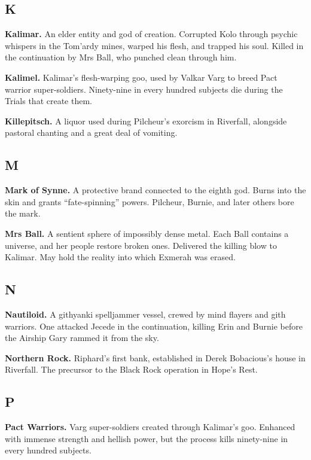 \subsection*{K}

\noindent
\textbf{Kalimar.} An elder entity and god of creation. Corrupted Kolo through psychic whispers in the Tom'ardy mines, warped his flesh, and trapped his soul. Killed in the continuation by Mrs Ball, who punched clean through him.

\smallskip \noindent
\textbf{Kalimel.} Kalimar's flesh-warping goo, used by Valkar Varg to breed Pact warrior super-soldiers. Ninety-nine in every hundred subjects die during the Trials that create them.

\smallskip \noindent
\textbf{Killepitsch.} A liquor used during Pilcheur's exorcism in Riverfall, alongside pastoral chanting and a great deal of vomiting.

\subsection*{M}

\noindent
\textbf{Mark of Synne.} A protective brand connected to the eighth god. Burns into the skin and grants ``fate-spinning'' powers. Pilcheur, Burnie, and later others bore the mark.

\smallskip \noindent
\textbf{Mrs Ball.} A sentient sphere of impossibly dense metal. Each Ball contains a universe, and her people restore broken ones. Delivered the killing blow to Kalimar. May hold the reality into which Exmerah was erased.

\subsection*{N}

\noindent
\textbf{Nautiloid.} A githyanki spelljammer vessel, crewed by mind flayers and gith warriors. One attacked Jecede in the continuation, killing Erin and Burnie before the Airship Gary rammed it from the sky.

\smallskip \noindent
\textbf{Northern Rock.} Riphard's first bank, established in Derek Bobacious's house in Riverfall. The precursor to the Black Rock operation in Hope's Rest.

\subsection*{P}

\noindent
\textbf{Pact Warriors.} Varg super-soldiers created through Kalimar's goo. Enhanced with immense strength and hellish power, but the process kills ninety-nine in every hundred subjects.

